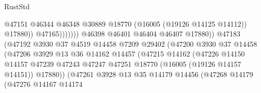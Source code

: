 \begin{lexlean}{RustStd}
\begin{coremodule}
                                                      @47151
                                                      @46344
                                                      @46348
                                                      @30889
                                                      @18770
                                                      (@16005 (@19126 @14125 @14112))
                                                      @17880))
                                                  @47165)))))))
                                    @46398
                                    @46401
                                    @46404
                                    @46407
                                    @17880))
                                @47183
                                (@47192
                                  @3930
                                  @37
                                  @4519
                                  @14458
                                  @7209
                                  @29402
                                  (@47200
                                    @3930
                                    @37
                                    @14458
                                    (@47206
                                      @3929
                                      @13
                                      @36
                                      @14162
                                      @14457
                                      (@47215
                                        @14162
                                        (@47226
                                          @14150
                                          @14157
                                          @47239
                                          @47243
                                          @47247
                                          @47251
                                          @18770
                                          (@16005 (@19126 @14157 @14151))
                                          @17880))
                                      (@47261
                                        @3928
                                        @13
                                        @35
                                        @14179
                                        @14456
                                        (@47268
                                          @14179
                                          (@47276
                                            @14167
                                            @14174

\end{coremodule}
\end{lexlean}
